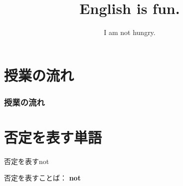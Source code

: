 \documentclass[aspectratio=169,xcolor={dvipsnames,table}]{beamer}
\title{English is fun.}
\subtitle{I am not hungry.}
\author{}
\institute[]{}
\date[]
\begin{document}
\begin{frame}[plain]
  \titlepage
\end{frame}

\section*{授業の流れ}
\begin{frame}[plain]
  \frametitle{授業の流れ}
  \tableofcontents
\end{frame}
\section{否定を表す単語}
\begin{frame}[plain]{否定を表すnot}
 \Large

否定を表すことば： {\LARGE\bfseries not}\hspace{20pt}
\end{frame}

\end{document}
